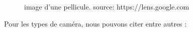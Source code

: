  \begin{figure}[H]%
 	\center%
 	\setlength{\fboxsep}{5pt}%
 	\setlength{\fboxrule}{0.5pt}%
 	\caption[Pellicule]{image d'une pellicule. source: https://lens.google.com}
 	\label{fig:Pellicule}
 \end{figure}
 
 
 Pour les types de caméra, nous pouvons citer entre autres \cite{noauthor_les_2015} :
 
